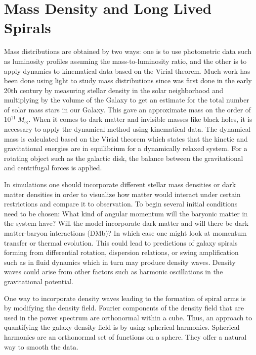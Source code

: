 \documentclass[11pt]{article}
\begin{document}
\section{Mass Density and Long Lived Spirals}
Mass distributions are obtained by two ways: one is to use photometric data such as luminosity profiles assuming the mass-to-luminosity ratio, and the other is to apply dynamics to kinematical data based on the Virial theorem. Much work has been done using light to study mass distributions since was first done in the early 20th century by measuring stellar density in the solar neighborhood and multiplying by the volume of the Galaxy to get an estimate for the total number of solar mass stars in our Galaxy. This gave an approximate mass on the order of 10$^{11}\ M_\odot$. When it comes to dark matter and invisible masses like black holes, it is necessary to apply the dynamical method using kinematical data. The dynamical mass is calculated based on the Virial theorem which states that the kinetic and gravitational energies are in equilibrium for a dynamically relaxed system. For a rotating object such as the galactic disk, the balance between the gravitational and centrifugal forces is applied.

In simulations one should incorporate different stellar mass densities or dark matter densities in order to visualize how matter would interact under certain restrictions and compare it to observation. To begin several initial conditions need to be chosen: What kind of angular momentum will the baryonic matter in the system have? Will the model incorporate dark matter and will there be dark matter-baryon interactions (DMb)? In which case one might look at momentum transfer or thermal evolution. This could lead to predictions of galaxy spirals forming from differential rotation, dispersion relations, or swing amplification such as in fluid dynamics which in turn may produce density waves. Density waves could arise from other factors such as harmonic oscillations in the gravitational potential. 

One way to incorporate density waves leading to the formation of spiral arms is by modifying the density field. Fourier components of the density field that are used in the power spectrum are orthonormal within a cube. Thus, an approach to quantifying the galaxy density field is by using spherical harmonics. Spherical harmonics are an orthonormal set of functions on a sphere. They offer a natural way to smooth the data. 
\end{document}
